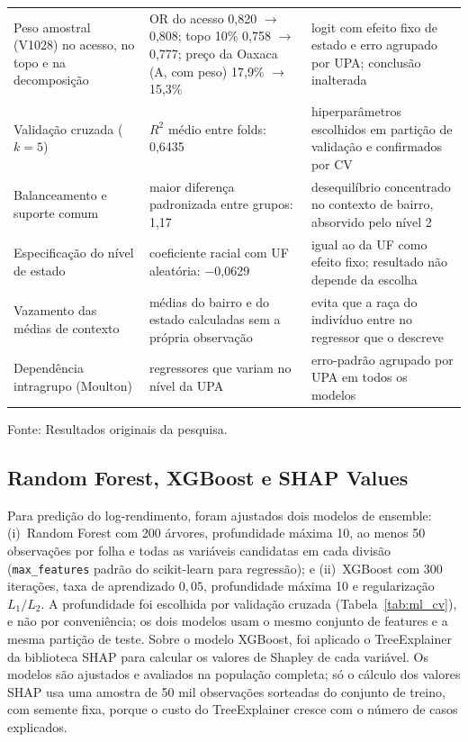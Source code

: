 \documentclass[11pt, a4paper, oneside]{article}
\begin{document}
\begin{table}[!ht]
\begin{tabular}{p{4.1cm}p{5.3cm}p{4.9cm}}
\addlinespace[2pt]
Peso amostral (V1028) no acesso, no topo e na decomposição & OR do acesso 0{,}820 $\to$ 0{,}808; topo 10\% 0{,}758 $\to$ 0{,}777; preço da Oaxaca (A, com peso) 17{,}9\% $\to$ 15{,}3\% & logit com efeito fixo de estado e erro agrupado por UPA; conclusão inalterada \\
\addlinespace[2pt]
Validação cruzada ($k=5$) & $R^2$ médio entre {folds}: 0{,}6435 & hiperparâmetros escolhidos em partição de validação e confirmados por CV \\
\addlinespace[2pt]
Balanceamento e suporte comum & maior diferença padronizada entre grupos: 1{,}17 & desequilíbrio concentrado no contexto de bairro, absorvido pelo nível 2 \\
\addlinespace[2pt]
Especificação do nível de estado & coeficiente racial com UF aleatória: −0{,}0629 & igual ao da UF como efeito fixo; resultado não depende da escolha \\
\addlinespace[2pt]
Vazamento das médias de contexto & médias do bairro e do estado calculadas sem a própria observação & evita que a raça do indivíduo entre no regressor que o descreve \\
\addlinespace[2pt]
Dependência intragrupo (Moulton) & regressores que variam no nível da UPA & erro-padrão agrupado por UPA em todos os modelos \\
\bottomrule
\end{tabular}
\par\smallskip\footnotesize Fonte: Resultados originais da pesquisa.
\end{table}


\subsection*{Random Forest, XGBoost e SHAP Values}

Para predição do log-rendimento, foram ajustados dois modelos de ensemble:
(i)~{Random Forest} \cite{breiman2001} com 200 árvores, profundidade
máxima 10, ao menos 50 observações por folha e todas as variáveis candidatas em cada
divisão (\texttt{max\_features} padrão do {scikit-learn} para regressão); e (ii)~{XGBoost} \cite{chen2016} com 300 iterações, taxa de aprendizado
$0{,}05$, profundidade máxima 10 e regularização $L_1/L_2$. A profundidade
foi escolhida por validação cruzada (Tabela~\ref{tab:ml_cv}), e não por conveniência;
os dois modelos usam o mesmo conjunto de {features} e a mesma partição de teste. Sobre o modelo XGBoost,
foi aplicado o {TreeExplainer} da biblioteca SHAP
\cite{lundberg2017} para calcular os valores de Shapley de cada variável. Os modelos são
ajustados e avaliados na população completa; só o cálculo dos valores SHAP usa uma amostra
de 50 mil observações sorteadas do conjunto de treino, com semente fixa, porque o custo do
{TreeExplainer} cresce com o número de casos explicados.
\end{document}
